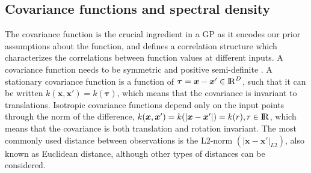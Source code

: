 \documentclass[onecolumn,a4paper,11pt]{article}
\begin{document}
\subsection{Covariance functions and spectral density}\label{ch4_sec_cov}

The covariance function is the crucial ingredient in a GP as it encodes our prior assumptions about the function, and defines a correlation structure which characterizes the correlations between function values at different inputs. A covariance function needs to be symmetric and positive semi-definite \citep{rasmussen2006gaussian}. A stationary covariance function is a function of $\bm{\tau}=\bm{x}-\bm{x}' \in {\rm I\!R}^D$, such that it can be written $k(\bm{x},\bm{x}') = k(\bm{\tau})$, which means that the covariance is invariant to translations. Isotropic covariance functions depend only on the input points through the norm of the difference, $k(\bm{x},\bm{x}') = k(|\bm{x}-\bm{x}'|) = k(r), r\in {\rm I\!R}$, which means that the covariance is both translation and rotation invariant. The most commonly used distance between observations is the L2-norm $(|\bm{x}-\bm{x}'|_{L2})$, also known as Euclidean distance, although other types of distances can be considered. 
\end{document}

